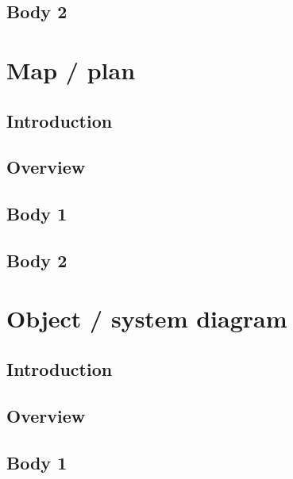 \documentclass[11pt,a4paper]{article}
\begin{document}
\subsection*{Body 2}
\vspace{1cm}
\clearpage
\section*{Map / plan}
\subsection*{Introduction}
\vspace{1cm}
\subsection*{Overview}
\vspace{1cm}
\subsection*{Body 1}
\vspace{1cm}
\subsection*{Body 2}
\vspace{1cm}
\clearpage
\section*{Object / system diagram}
\subsection*{Introduction}
\vspace{1cm}
\subsection*{Overview}
\vspace{1cm}
\subsection*{Body 1}
\vspace{1cm}
\end{document}
